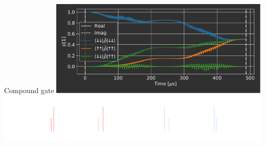 \documentclass[aspectratio=169]{beamer}
\begin{document}
	\begin{frame}{Compound gate}
		\centering
		\includegraphics[height=12.5em]{test.pdf}
		\includegraphics[width=0.75\linewidth]{Compound-gate.pdf}
	\end{frame}


\end{document}
